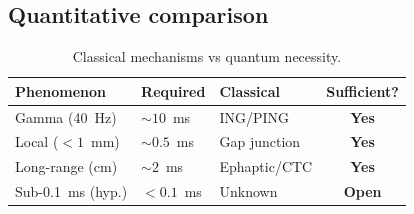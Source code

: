 \documentclass[twocolumn,10pt]{article}
\begin{document}
\subsection{Quantitative comparison}
\begin{table}[h]
\centering
\caption{Classical mechanisms vs quantum necessity.}
\label{tab:classical_quantum}
\small
\begin{tabular}{p{2.8cm}p{1.8cm}p{2.2cm}c}
\toprule
\textbf{Phenomenon} & \textbf{Required} & \textbf{Classical} &
\textbf{Sufficient?} \\
\midrule
Gamma (40~Hz) & $\sim 10$~ms & ING/PING & \textbf{Yes} \\
Local ($<1$~mm) & $\sim 0.5$~ms & Gap junction & \textbf{Yes} \\
Long-range (cm) & $\sim 2$~ms & Ephaptic/CTC & \textbf{Yes} \\
Sub-0.1~ms (hyp.) & $< 0.1$~ms & Unknown & \textbf{Open} \\
\bottomrule
\end{tabular}
\end{table}
\end{document}
